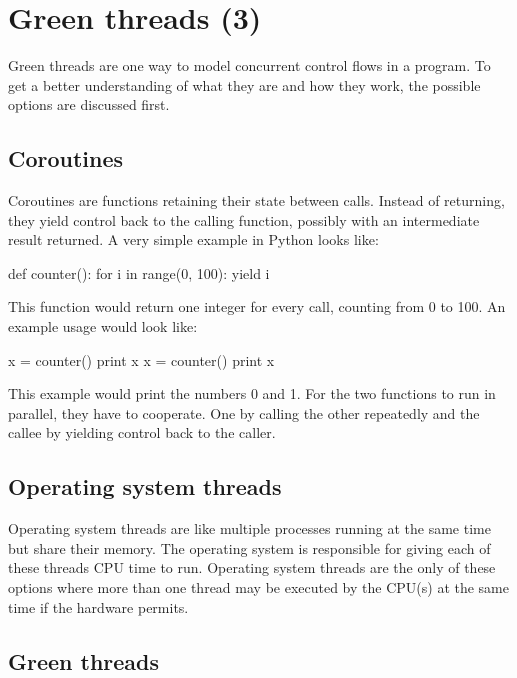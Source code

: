\documentclass[bachelor,english]{hgbthesis}
\begin{document}
\chapter{Green threads (3)}
\label{cha:green_threads}

Green threads are one way to model concurrent control flows in a program. To get a better understanding of what they are and how they work, the possible options are discussed first.

\section{Coroutines}

Coroutines are functions retaining their state between calls. Instead of returning, they yield control back to the calling function, possibly with an intermediate result returned. A very simple example in Python looks like:
\begin{GenericCode}
def counter():
    for i in range(0, 100):
	yield i
\end{GenericCode}
This function would return one integer for every call, counting from 0 to 100. An example usage would look like:
\begin{GenericCode}
x = counter()
print x
x = counter()
print x
\end{GenericCode}
This example would print the numbers 0 and 1. For the two functions to run in parallel, they have to cooperate. One by calling the other repeatedly and the callee by yielding control back to the caller.

\section{Operating system threads}

Operating system threads are like multiple processes running at the same time but share their memory. The operating system is responsible for giving each of these threads CPU time to run. Operating system threads are the only of these options where more than one thread may be executed by the CPU(s) at the same time if the hardware permits.

\section {Green threads}
\end{document}
